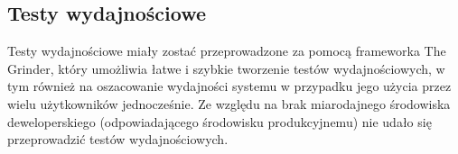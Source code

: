 \documentclass[runningheads]{llncs}
\begin{document}
\subsection{Testy wydajnościowe}
Testy wydajnościowe miały zostać przeprowadzone  za pomocą frameworka The
Grinder, który 
umożliwia łatwe i szybkie  tworzenie  testów wydajnościowych, w tym również
na oszacowanie wydajności systemu w przypadku  jego użycia przez wielu
użytkowników jednocześnie. Ze względu na brak miarodajnego środowiska
deweloperskiego (odpowiadającego środowisku produkcyjnemu) nie udało się
przeprowadzić testów wydajnościowych.

\clearpage
 
\end{document}
